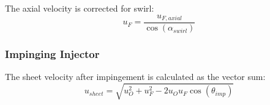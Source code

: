 The axial velocity is corrected for swirl:
\begin{equation}
u_F = \frac{u_{F,axial}}{\cos(\alpha_{swirl})}
\end{equation}

\subsubsection{Impinging Injector}
The sheet velocity after impingement is calculated as the vector sum:
\begin{equation}
u_{sheet} = \sqrt{u_O^2 + u_F^2 - 2 u_O u_F \cos(\theta_{imp})}
\end{equation}

